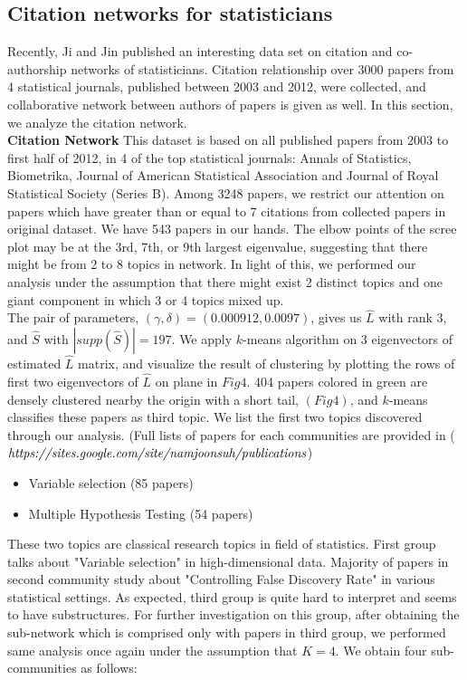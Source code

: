\documentclass[AMS,STIX1COL]{WileyNJD-v2}
\begin{document}
\subsection{Citation networks for statisticians }
Recently, Ji and Jin \cite{ji2016coauthorship} published an interesting data set on citation  and co-authorship networks of statisticians.
Citation relationship over 3000 papers from 4 statistical journals, published between 2003 and 2012, were collected, and collaborative network between authors of papers is given as well.
In this section, we analyze the citation network. \\

\noindent\textbf{Citation Network} This dataset is based on all published papers from 2003 to first half of 2012, in 4 of the top statistical journals: Annals of Statistics, Biometrika, Journal of American Statistical Association and Journal of Royal Statistical Society (Series B).
Among  3248 papers, we restrict our attention on papers which have greater than or equal to 7 citations from collected papers in original dataset.
We have 543 papers in our hands.
The elbow points of the scree plot may be at the 3rd, 7th, or 9th largest eigenvalue, suggesting that there might be from 2 to 8 topics in network.
In light of this, we performed our analysis under the assumption that there might exist 2 distinct topics and one giant component in which 3 or 4 topics mixed up. \\

The pair of parameters, $(\gamma,\delta) = (0.000912,0.0097)$, gives us $\widehat{L}$ with rank 3, and $\widehat{S}$ with $|supp(\widehat{S})|=197$.
We apply $k$-means algorithm on 3 eigenvectors of estimated $\widehat{L}$ matrix, and visualize the result of clustering by plotting the rows of first two eigenvectors of $\widehat{L}$ on plane in $Fig 4$.
404 papers colored in green are densely clustered nearby the origin with a short tail, $(Fig 4)$, and $k$-means classifies these papers as third topic.
We list the first two topics discovered through our analysis.
(Full lists of papers for each communities are provided in ($\emph{https://sites.google.com/site/namjoonsuh/publications}$)

\begin{itemize}
  \item Variable selection (85 papers)
  \item Multiple Hypothesis Testing (54 papers)
\end{itemize}

\noindent These two topics are classical research topics in field of statistics.
First group talks about "Variable selection" in high-dimensional data.
Majority of papers in second community study about "Controlling False Discovery Rate" in various statistical settings.
As expected, third group is quite hard to interpret and seems to have substructures.
For further investigation on this group, after obtaining the sub-network which is comprised only with papers in third group, we performed same analysis once again under the assumption that $K=4$.
We obtain four sub-communities as follows:
\end{document}

